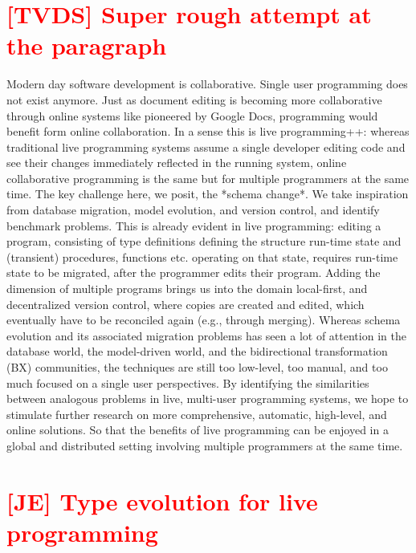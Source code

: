 \documentclass[english,submission]{programming}
\begin{document}
%
%
\printbibliography



\section{\textcolor{red}{[TVDS] Super rough attempt at the paragraph}}

Modern day software development is collaborative. Single user programming does not exist anymore.
Just as document editing is becoming more collaborative through online systems like pioneered by Google Docs,
programming would benefit form online collaboration. In a sense this is live programming++: whereas traditional
live programming systems assume a single developer editing code and see their changes immediately reflected
in the running system, online collaborative programming is the same but for multiple programmers at the same time.
The key challenge here, we posit, the *schema change*. We take inspiration from database migration,
model evolution, and version control, and identify benchmark problems. This is already evident in live programming:
editing a program, consisting of type definitions defining the structure run-time state and (transient) procedures, functions
etc. operating on that state, requires run-time state to be migrated, after the programmer edits their program.
Adding the dimension of multiple programs brings us into the domain local-first, and decentralized version control, where
copies are created and edited, which eventually have to be reconciled again (e.g., through merging).
Whereas schema evolution and its associated migration problems has seen a lot of attention in the database world,
the model-driven world, and the bidirectional transformation (BX) communities, the techniques are still too low-level,
too manual, and too much focused on a single user perspectives. By identifying the similarities between analogous
problems in live, multi-user programming systems, we hope to stimulate further research on more comprehensive, automatic,
high-level, and online solutions. So that the benefits of live programming can be enjoyed in a global and distributed setting
involving multiple programmers at the same time.

\section{\textcolor{red}{[JE] Type evolution for live programming}}
\end{document}
